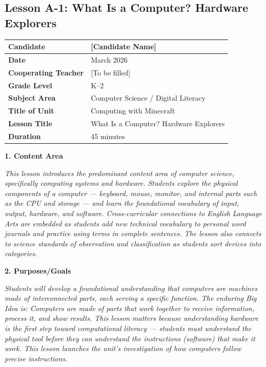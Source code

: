 \documentclass[11pt,letterpaper]{article}
\begin{document}
\subsection{Lesson A-1: What Is a Computer? Hardware Explorers}
\label{sub:LessonA1WhatIsaComputerHardwareExplorers}

\begin{longtable}{|L{0.28\textwidth}|L{0.65\textwidth}|}
\hline
\textbf{Candidate}  & [Candidate Name]  \\
\hline
\textbf{Date}  & March 2026  \\
\hline
\textbf{Cooperating Teacher}  & [To be filled]  \\
\hline
\textbf{Grade Level}  & K--2  \\
\hline
\textbf{Subject Area}  & Computer Science / Digital Literacy  \\
\hline
\textbf{Title of Unit}  & Computing with Minecraft  \\
\hline
\textbf{Lesson Title}  & What Is a Computer? Hardware Explorers  \\
\hline
\textbf{Duration}  & 45 minutes  \\
\hline
\end{longtable}

\textbf{1. Content Area}

\textit{This lesson introduces the predominant content area of computer science, specifically computing systems and hardware. Students explore the physical components of a computer --- keyboard, mouse, monitor, and internal parts such as the CPU and storage --- and learn the foundational vocabulary of input, output, hardware, and software. Cross-curricular connections to English Language Arts are embedded as students add new technical vocabulary to personal word journals and practice using terms in complete sentences. The lesson also connects to science standards of observation and classification as students sort devices into categories.}

\textbf{2. Purposes/Goals}

\textit{Students will develop a foundational understanding that computers are machines made of interconnected parts, each serving a specific function. The enduring Big Idea is: Computers are made of parts that work together to receive information, process it, and show results. This lesson matters because understanding hardware is the first step toward computational literacy --- students must understand the physical tool before they can understand the instructions (software) that make it work. This lesson launches the unit's investigation of how computers follow precise instructions.}
\end{document}
